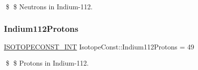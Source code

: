 \$ \$ Neutrons in Indium-\/112. \mbox{\label{group___isotope_const-_indium-_in112_gaa73dd163a5b96491471405d681070d68}} 
\subsubsection{\texorpdfstring{Indium112\+Protons}{Indium112Protons}}
{\footnotesize\ttfamily \mbox{\hyperlink{group___isotope_const-_macros_ga5f18360b3e99483a35c32d789e62621c}{I\+S\+O\+T\+O\+P\+E\+C\+O\+N\+S\+T\+\_\+\+I\+NT}} Isotope\+Const\+::\+Indium112\+Protons = 49}

\$ \$ Protons in Indium-\/112. 